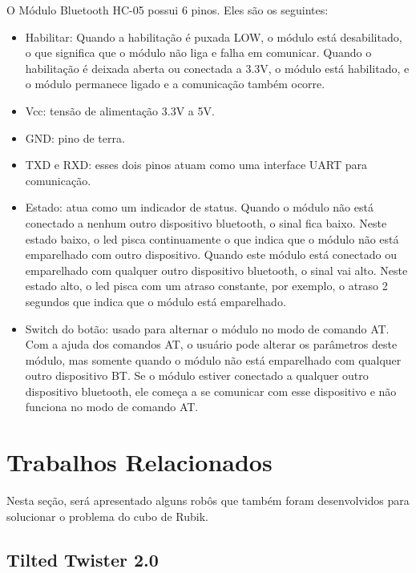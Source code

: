     O Módulo Bluetooth HC-05 possui 6 pinos. Eles são os seguintes:
    
     \begin{itemize}
       \item Habilitar: 
    Quando a habilitação é puxada LOW, o módulo está desabilitado, o que significa que o módulo não liga e falha em comunicar. Quando o habilitação é deixada aberta ou conectada a 3.3V, o módulo está habilitado, e o módulo permanece ligado e a comunicação também ocorre.
       \item Vcc: tensão de alimentação 3.3V a 5V.
       \item GND: pino de terra.
       \item TXD e RXD: esses dois pinos atuam como uma interface UART para comunicação.
       \item Estado: atua como um indicador de status. Quando o módulo não está conectado a nenhum outro dispositivo bluetooth, o sinal fica baixo. Neste estado baixo, o led pisca continuamente o que indica que o módulo não está emparelhado com outro dispositivo. Quando este módulo está conectado ou emparelhado com qualquer outro dispositivo bluetooth, o sinal vai alto. Neste estado alto, o led pisca com um atraso constante, por exemplo, o atraso 2 segundos que indica que o módulo está emparelhado.
       \item Switch do botão: usado para alternar o módulo no modo de comando AT. Com a ajuda dos comandos AT, o usuário pode alterar os parâmetros deste módulo, mas somente quando o módulo não está emparelhado com qualquer outro dispositivo BT. Se o módulo estiver conectado a qualquer outro dispositivo bluetooth, ele começa a se comunicar com esse dispositivo e não funciona no modo de comando AT.
     \end{itemize}\cite{bluetooth}


\section{Trabalhos Relacionados}

Nesta seção, será apresentado alguns robôs que também foram desenvolvidos para solucionar o problema do cubo de Rubik.

\subsection{Tilted Twister 2.0}

